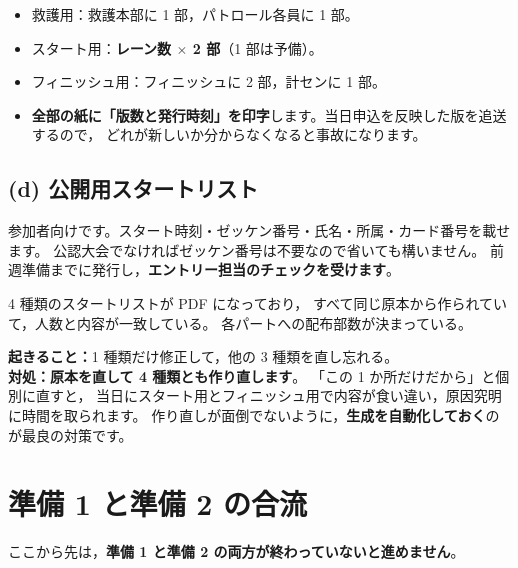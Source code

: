 \begin{Note}[部数と配り方]
\begin{itemize}
\item 救護用：救護本部に 1 部，パトロール各員に 1 部。
\item スタート用：\textbf{レーン数 $\times$ 2 部}（1 部は予備）。
\item フィニッシュ用：フィニッシュに 2 部，計センに 1 部。
\item \textbf{全部の紙に「版数と発行時刻」を印字}します。当日申込を反映した版を追送するので，
      どれが新しいか分からなくなると事故になります。
\end{itemize}
\end{Note}

\subsection*{(d) 公開用スタートリスト}

参加者向けです。スタート時刻・ゼッケン番号・氏名・所属・カード番号を載せます。
公認大会でなければゼッケン番号は不要なので省いても構いません。
前週準備までに発行し，\textbf{エントリー担当のチェックを受けます}。

\begin{Done}
4 種類のスタートリストが PDF になっており，
すべて同じ原本から作られていて，人数と内容が一致している。
各パートへの配布部数が決まっている。
\end{Done}

\begin{Fail}
\textbf{起きること：}1 種類だけ修正して，他の 3 種類を直し忘れる。\\
\textbf{対処：}\textbf{原本を直して 4 種類とも作り直します}。
「この 1 か所だけだから」と個別に直すと，
当日にスタート用とフィニッシュ用で内容が食い違い，原因究明に時間を取られます。
作り直しが面倒でないように，\textbf{生成を自動化しておく}のが最良の対策です。
\end{Fail}


\section{準備 1 と準備 2 の合流}

ここから先は，\textbf{準備 1 と準備 2 の両方が終わっていないと進めません}。

